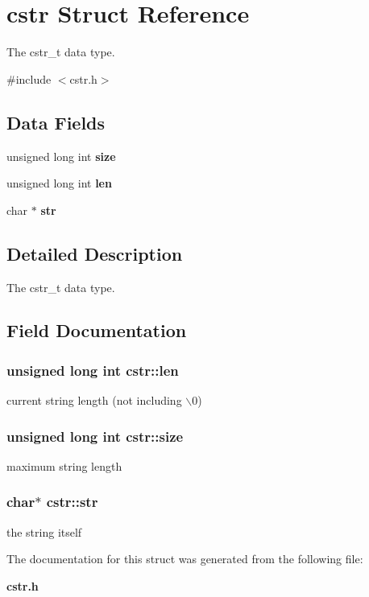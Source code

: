 \section{cstr Struct Reference}
\label{structcstr}


The cstr\_\-t data type.  


{\ttfamily \#include $<$cstr.h$>$}\subsection*{Data Fields}
\begin{DoxyCompactItemize}
\item 
unsigned long int {\bf size}
\item 
unsigned long int {\bf len}
\item 
char $\ast$ {\bf str}
\end{DoxyCompactItemize}


\subsection{Detailed Description}
The cstr\_\-t data type. 

\subsection{Field Documentation}
\subsubsection[{len}]{\setlength{\rightskip}{0pt plus 5cm}unsigned long int {\bf cstr::len}}\label{structcstr_a17069b6f1082e8f271fda54601f7b196}
current string length (not including $\backslash$0) 
\subsubsection[{size}]{\setlength{\rightskip}{0pt plus 5cm}unsigned long int {\bf cstr::size}}\label{structcstr_aa294dc1a9ca44bcd22c8588118a25388}
maximum string length 
\subsubsection[{str}]{\setlength{\rightskip}{0pt plus 5cm}char$\ast$ {\bf cstr::str}}\label{structcstr_af56ba5b7ade0b705ff5b5f49d290075a}
the string itself 

The documentation for this struct was generated from the following file:\begin{DoxyCompactItemize}
\item 
{\bf cstr.h}\end{DoxyCompactItemize}
